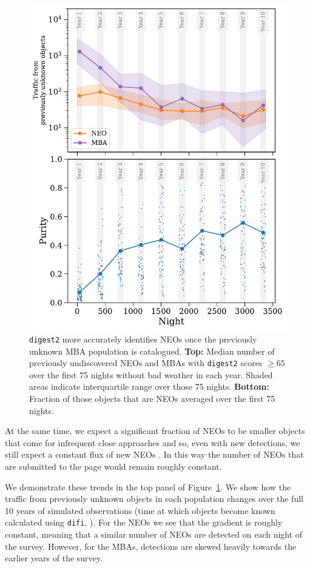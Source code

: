 \documentclass[twocolumn]{aastex631}
\newcommand{\dig}{\texttt{digest2}}
\begin{document}
\begin{figure}[tb]
    \centering
    \includegraphics[width=\columnwidth]{figures/digest2_purity_over_lsst.pdf}
    \caption{\dig{} more accurately identifies NEOs once the previously unknown MBA population is catalogued. \textbf{Top:} Median number of previously undiscovered NEOs and MBAs with \dig{} scores $\ge 65$ over the first 75 nights without bad weather in each year. Shaded areas indicate interquartile range over those 75 nights. \textbf{Bottom:} Fraction of those objects that are NEOs averaged over the first 75 nights.}
    \label{fig:digest2_purity_improvements}
\end{figure}

At the same time, we expect a significant fraction of NEOs to be smaller objects that come for infrequent close approaches and so, even with new detections, we still expect a constant flux of new NEOs \citep{Juric+2020}. In this way the number of NEOs that are submitted to the page would remain roughly constant.

We demonstrate these trends in the top panel of Figure~\ref{fig:digest2_purity_improvements}. We show how the traffic from previously unknown objects in each population changes over the full 10 years of simulated observations (time at which objects become known calculated using \texttt{difi}, \citealp{difi}). For the NEOs we see that the gradient is roughly constant, meaning that a similar number of NEOs are detected on each night of the survey. However, for the MBAs, detections are skewed heavily towards the earlier years of the survey.
\end{document}
